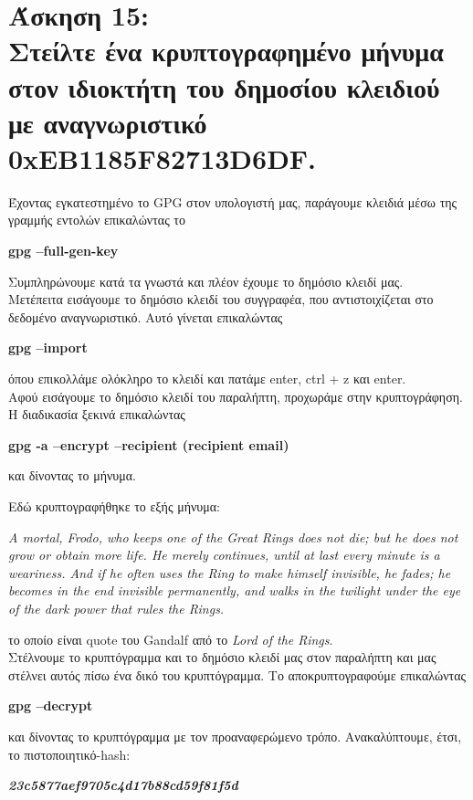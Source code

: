 \documentclass{article}
\newcommand{\lt}[1]{\latintext #1\greektext}
\newcommand{\task}[2]{\newpage\section*{Άσκηση #1:\\#2}}
\newcommand{\blt}[1]{\lt{\textbf{#1}}}
\begin{document}
\task{15}{
    Στείλτε ένα κρυπτογραφημένο μήνυμα στον ιδιοκτήτη του δημοσίου κλειδιού με αναγνωριστικό \lt{0xEB1185F82713D6DF}.
}
{
    Έχοντας εγκατεστημένο το \lt{GPG} στον υπολογιστή μας, παράγουμε κλειδιά μέσω της γραμμής εντολών επικαλώντας το
    \begin{center}
        \blt{gpg --full-gen-key}
    \end{center}
    Συμπληρώνουμε κατά τα γνωστά και πλέον έχουμε το δημόσιο κλειδί μας.\\

    Μετέπειτα εισάγουμε το δημόσιο κλειδί του συγγραφέα, που αντιστοιχίζεται στο δεδομένο αναγνωριστικό. Αυτό γίνεται επικαλώντας
    \begin{center}
        \blt{gpg --import}
    \end{center}
    όπου επικολλάμε ολόκληρο το κλειδί και πατάμε \lt{enter}, \lt{ctrl + z} και \lt{enter}.\\

    Αφού εισάγουμε το δημόσιο κλειδί του παραλήπτη, προχωράμε στην κρυπτογράφηση. Η διαδικασία ξεκινά επικαλώντας
    \begin{center}
        \blt{gpg -a --encrypt --recipient (recipient email)}
    \end{center}
    και δίνοντας το μήνυμα.

    \newpage
    
    Εδώ κρυπτογραφήθηκε το εξής μήνυμα:
    \begin{center}
        \large
        \lt{\textit{A mortal, Frodo, who keeps one of the Great Rings does not die; but he does not grow or obtain more life. He merely continues, until at last every minute is a weariness. And if he often uses the Ring to make himself invisible, he fades; he becomes in the end invisible permanently, and walks in the twilight under the eye of the dark power that rules the Rings.}}
    \end{center}
    το οποίο είναι \lt{quote} του \lt{Gandalf} από το \textit{\lt{Lord of the Rings}}.\\

    Στέλνουμε το κρυπτόγραμμα και το δημόσιο κλειδί μας στον παραλήπτη και μας στέλνει αυτός πίσω ένα δικό του κρυπτόγραμμα. Το αποκρυπτογραφούμε επικαλώντας
    \begin{center}
        \blt{gpg --decrypt}
    \end{center}
    και δίνοντας το κρυπτόγραμμα με τον προαναφερώμενο τρόπο. Ανακαλύπτουμε,
    έτσι, το πιστοποιητικό-\lt{hash}:
    \begin{center}
        \textit{\blt{23c5877aef9705c4d17b88cd59f81f5d}}
    \end{center}
}
\end{document}

